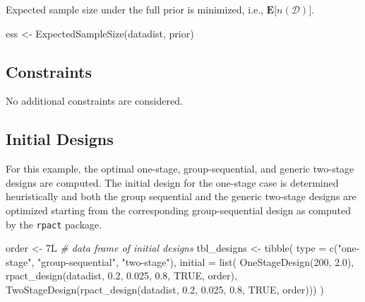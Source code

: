 \documentclass[
]{book}
\newenvironment{Shaded}{\begin{snugshade}}{\end{snugshade}}
\newcommand{\AttributeTok}[1]{\textcolor[rgb]{0.77,0.63,0.00}{#1}}
\newcommand{\CommentTok}[1]{\textcolor[rgb]{0.56,0.35,0.01}{\textit{#1}}}
\newcommand{\ConstantTok}[1]{\textcolor[rgb]{0.00,0.00,0.00}{#1}}
\newcommand{\DecValTok}[1]{\textcolor[rgb]{0.00,0.00,0.81}{#1}}
\newcommand{\FloatTok}[1]{\textcolor[rgb]{0.00,0.00,0.81}{#1}}
\newcommand{\FunctionTok}[1]{\textcolor[rgb]{0.00,0.00,0.00}{#1}}
\newcommand{\NormalTok}[1]{#1}
\newcommand{\OtherTok}[1]{\textcolor[rgb]{0.56,0.35,0.01}{#1}}
\newcommand{\StringTok}[1]{\textcolor[rgb]{0.31,0.60,0.02}{#1}}
\begin{document}
Expected sample size under the full prior is minimized, i.e., \(\boldsymbol{E}\big[n(\mathscr{D})\big]\).

\begin{Shaded}
\begin{Highlighting}[]
\NormalTok{ess }\OtherTok{\textless{}{-}} \FunctionTok{ExpectedSampleSize}\NormalTok{(datadist, prior)}
\end{Highlighting}
\end{Shaded}

\hypertarget{constraints-17}{%
\subsection{Constraints}\label{constraints-17}}

No additional constraints are considered.

\hypertarget{initial-designs-2}{%
\subsection{Initial Designs}\label{initial-designs-2}}

For this example, the optimal one-stage, group-sequential, and generic two-stage designs are computed. The initial design for the one-stage case is determined heuristically and both the group sequential and the generic two-stage designs are optimized starting from the corresponding group-sequential design as computed by the \texttt{rpact} package.

\begin{Shaded}
\begin{Highlighting}[]
\NormalTok{order }\OtherTok{\textless{}{-}}\NormalTok{ 7L}
\CommentTok{\# data frame of initial designs }
\NormalTok{tbl\_designs }\OtherTok{\textless{}{-}} \FunctionTok{tibble}\NormalTok{(}
    \AttributeTok{type    =} \FunctionTok{c}\NormalTok{(}\StringTok{"one{-}stage"}\NormalTok{, }\StringTok{"group{-}sequential"}\NormalTok{, }\StringTok{"two{-}stage"}\NormalTok{),}
    \AttributeTok{initial =} \FunctionTok{list}\NormalTok{(}
        \FunctionTok{OneStageDesign}\NormalTok{(}\DecValTok{200}\NormalTok{, }\FloatTok{2.0}\NormalTok{),}
        \FunctionTok{rpact\_design}\NormalTok{(datadist, }\FloatTok{0.2}\NormalTok{, }\FloatTok{0.025}\NormalTok{, }\FloatTok{0.8}\NormalTok{, }\ConstantTok{TRUE}\NormalTok{, order),}
        \FunctionTok{TwoStageDesign}\NormalTok{(}\FunctionTok{rpact\_design}\NormalTok{(datadist, }\FloatTok{0.2}\NormalTok{, }\FloatTok{0.025}\NormalTok{, }\FloatTok{0.8}\NormalTok{, }\ConstantTok{TRUE}\NormalTok{, order))) )}
\end{Highlighting}
\end{Shaded}
\end{document}
